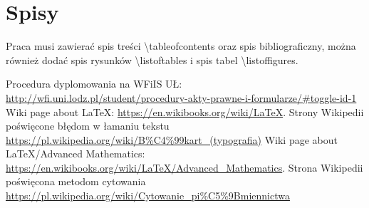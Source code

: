 \documentclass{wfiisul}
\begin{document}
\section{Spisy}
Praca musi zawierać spis treści {\textbackslash}tableofcontents oraz spis bibliograficzny, można również dodać spis rysunków  {\textbackslash}listoftables i spis tabel {\textbackslash}listoffigures. 

\listoftables
\listoffigures

 Procedura dyplomowania na WFiIS UŁ:
\url{http://wfi.uni.lodz.pl/student/procedury-akty-prawne-i-formularze/#toggle-id-1}
 Wiki page about LaTeX: \url{https://en.wikibooks.org/wiki/LaTeX}.
 Strony Wikipedii poświęcone błędom w łamaniu tekstu\\
\url{https://pl.wikipedia.org/wiki/B%C4%99kart_(typografia)}
 Wiki page about LaTeX/Advanced Mathematics: \url{https://en.wikibooks.org/wiki/LaTeX/Advanced_Mathematics}.
 Strona Wikipedii poświęcona metodom cytowania \\
\url{https://pl.wikipedia.org/wiki/Cytowanie_pi%C5%9Bmiennictwa}
\end{document}
